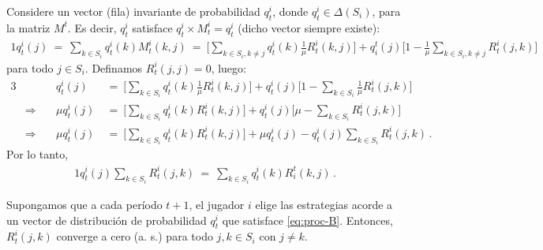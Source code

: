 Considere un vector (fila) invariante de probabilidad $q^i_t$, donde $q^i_t\in \Delta(S_i)$, para la matriz $M^t$. Es decir, $q^i_t$ satisface $q^i_t \times M^i_t = q^i_t$ (dicho vector siempre existe):
\begin{alignat}{1}
  q^i_t(j)\ 
    =\ \sum_{k\in S_i} q^i_t(k) M^i_t(k,j)\ 
    =\ \bigg[\sum_{k \in S_i, k \neq j} q^i_t(k)\frac{1}{\mu}R^i_t(k,j)\bigg] + q_i^t(j)\biggl[1 - \frac{1}{\mu}\sum_{k \in S_i, k \neq j} R^i_t(j,k)\biggr]
\end{alignat}
para todo $j \in S_i$. Definamos $R_t^i(j, j) = 0$, luego:
\begin{alignat}{3}
  &
  & q^i_t(j)\ &=\ \biggl[\sum_{k \in S_i} q^i_t(k)\frac{1}{\mu}R^i_t(k,j)\biggr] + q^i_t(j)\biggl[1 - \sum_{k \in S_i} \frac{1}{\mu} R^i_t(j,k)\biggr] \\
  &\Rightarrow\quad
  &\mu q_t^i(j)\ &=\ \biggl[\sum_{k \in S_i}q^i_t(k)R^i_t(k,j)\biggr] + q^i_t(j)\biggl[\mu - \sum_{k \in S_i} R^i_t(j, k)\biggr] \\
  &\Rightarrow\quad
  &\mu q^i_t(j)\ & =\ \biggl[\sum_{k \in S_i}q^i_t(k)R^i_t(k,j)\biggr] + \mu q^i_t(j) - q^i_t(j)\sum_{k\in S_i} R^i_t(j,k) \,.
\end{alignat}
Por lo tanto,
\begin{alignat}{1}
\label{eq:proc-B}
q^i_t(j)\sum_{k \in S_i} R^i_t(j,k)\ =\ \sum_{k \in S_i} q_t^i(k)R_i^t(k,j) \,.
\end{alignat}

\begin{theorem}
Supongamos que a cada período $t+1$, el jugador $i$ elige las estrategias acorde a un vector de distribución de probabilidad $q_t^i$ que satisface \eqref{eq:proc-B}. Entonces, $R^i_t(j, k)$ converge a cero (a. s.) para todo $j, k \in S_i$ con $j \neq k$.
\end{theorem}

